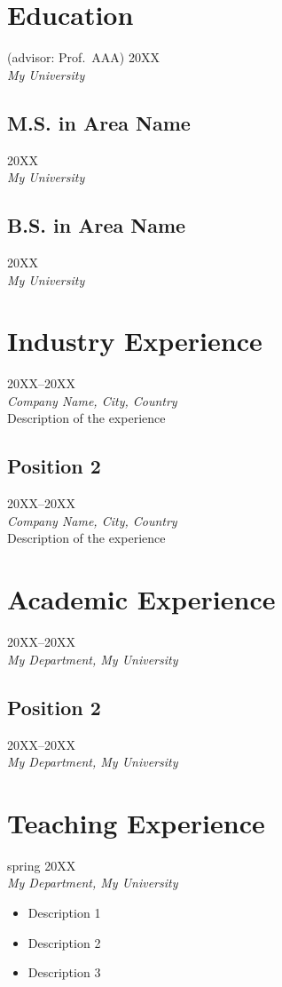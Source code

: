     \section{Education}
	 (advisor: Prof.~AAA) \hfill 20XX\\
	\textsl{My University}
	
	\subsection{M.S. in Area Name} \hfill 20XX\\
	\textsl{My University}
	
	\subsection{B.S. in Area Name} \hfill 20XX\\
	\textsl{My University}

    \section{Industry Experience}
     \hfill 20XX--20XX\\
	\textsl{Company Name, City, Country}\\
	Description of the experience
	
    \subsection{Position 2} \hfill 20XX--20XX\\
	\textsl{Company Name, City, Country}\\
	Description of the experience

    \section{Academic Experience}
	 \hfill 20XX--20XX\\
	\textsl{My Department, My University}

	\subsection{Position 2} \hfill 20XX--20XX\\
	\textsl{My Department, My University}

	\section{Teaching Experience}
	 \hfill spring 20XX\\
	\textsl{My Department, My University}
	\begin{itemize}
		\item Description 1
		\item Description 2
		\item Description 3
	\end{itemize}

